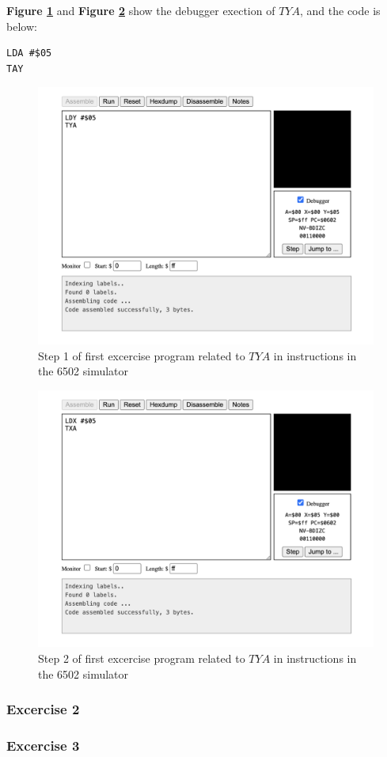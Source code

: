 \documentclass[a4paper]{article}
\begin{document}
\textbf{Figure \ref{fig:21-ex1-3-step1}} and \textbf{Figure \ref{fig:22-ex1-3-step2}} show the debugger exection of $TYA$, and the code is below:


\begin{lstlisting}[style=6502asm]
LDA #$05
TAY
\end{lstlisting}

\begin{figure}[H]
    \centering
    \includegraphics[width=1.0\textwidth]{res/images/q2/21-ex1-3-step1.png}
    \caption{Step 1 of first excercise program related to $TYA$ in instructions in the 6502 simulator}
    \label{fig:21-ex1-3-step1}
\end{figure}

\begin{figure}[H]
    \centering
    \includegraphics[width=1.0\textwidth]{res/images/q2/19-ex1-2-step1.png}
    \caption{Step 2 of first excercise program related to $TYA$ in instructions in the 6502 simulator}
    \label{fig:22-ex1-3-step2}
\end{figure}

\subsubsection{Excercise 2}



\subsubsection{Excercise 3}
\end{document}
